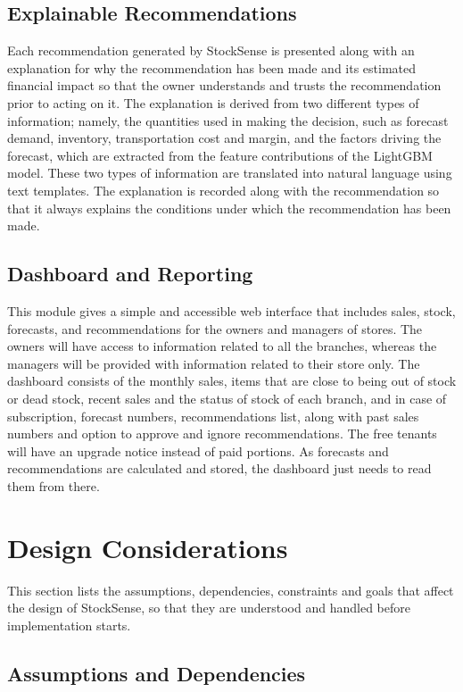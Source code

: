\documentclass{StockSense}
\begin{document}
\subsection{Explainable Recommendations}

Each recommendation generated by StockSense is presented along with an explanation for why the recommendation has been made and its estimated financial impact so that the owner understands and trusts the recommendation prior to acting on it. The explanation is derived from two different types of information; namely, the quantities used in making the decision, such as forecast demand, inventory, transportation cost and margin, and the factors driving the forecast, which are extracted from the feature contributions of the LightGBM model. These two types of information are translated into natural language using text templates. The explanation is recorded along with the recommendation so that it always explains the conditions under which the recommendation has been made.

\subsection{Dashboard and Reporting}

This module gives a simple and accessible web interface that includes sales, stock, forecasts, and recommendations for the owners and managers of stores. The owners will have access to information related to all the branches, whereas the managers will be provided with information related to their store only. The dashboard consists of the monthly sales, items that are close to being out of stock or dead stock, recent sales and the status of stock of each branch, and in case of subscription, forecast numbers, recommendations list, along with past sales numbers and option to approve and ignore recommendations. The free tenants will have an upgrade notice instead of paid portions. As forecasts and recommendations are calculated and stored, the dashboard just needs to read them from there.

\section{Design Considerations}

This section lists the assumptions, dependencies, constraints and goals that affect the design of StockSense, so that they are understood and handled before implementation starts.

\subsection{Assumptions and Dependencies}
\end{document}
